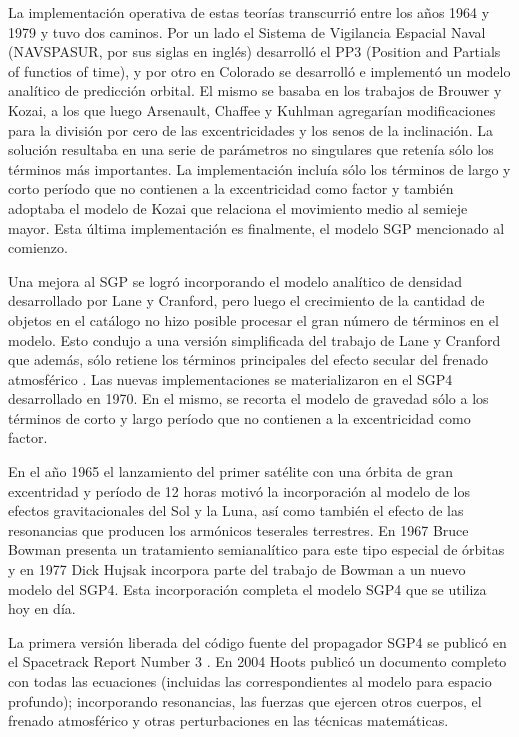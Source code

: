 {La implementaci\'on operativa de estas teor\'ias transcurri\'o entre los a\~nos 1964 y 1979 y tuvo dos caminos. Por un lado el Sistema de Vigilancia Espacial Naval (NAVSPASUR, por sus siglas en ingl\'es) desarroll\'o el PP3 (Position and Partials of functios of time), y por otro en Colorado se desarroll\'o e implement\'o un modelo anal\'itico de predicci\'on orbital. El mismo se basaba en los trabajos de Brouwer y Kozai, a los que luego Arsenault, Chaffee y Kuhlman \citep{arsenault1964general} agregar\'ian modificaciones para la divisi\'on por cero de las excentricidades y los senos de la inclinaci\'on. La soluci\'on resultaba en una serie de par\'ametros no singulares que reten\'ia s\'olo los t\'erminos m\'as importantes. La implementaci\'on inclu\'ia s\'olo los t\'erminos de largo y corto per\'iodo que no contienen a la excentricidad como factor y tambi\'en adoptaba el modelo de Kozai que relaciona el movimiento medio al semieje mayor. Esta \'ultima implementaci\'on es finalmente, el modelo SGP mencionado al comienzo.

Una mejora al SGP se logr\'o incorporando el modelo anal\'itico de densidad desarrollado por Lane y Cranford, pero luego el crecimiento de la cantidad de objetos en el cat\'alogo no hizo posible procesar el gran n\'umero de t\'erminos en el modelo. Esto condujo a una versi\'on simplificada del trabajo de Lane y Cranford que adem\'as, s\'olo retiene los t\'erminos principales del efecto secular del frenado atmosf\'erico \citep{lane1979general}. Las nuevas implementaciones se materializaron en el SGP4 desarrollado en 1970. En el mismo, se recorta el modelo de gravedad s\'olo a los t\'erminos de corto y largo per\'iodo que no contienen a la excentricidad como factor. 

En el a\~no 1965 el lanzamiento del primer sat\'elite con una \'orbita de gran excentridad y per\'iodo de 12 horas motiv\'o la incorporaci\'on al modelo de los efectos gravitacionales del Sol y la Luna, as\'i como tambi\'en el efecto de las resonancias que producen los arm\'onicos teserales terrestres. En 1967 Bruce Bowman \citep{bowman1971first} presenta un tratamiento semianal\'itico para este tipo especial de \'orbitas y en 1977 Dick Hujsak \citep{hujsak1979restricted} incorpora parte del trabajo de Bowman a un nuevo modelo del SGP4. Esta incorporaci\'on completa el modelo SGP4 que se utiliza hoy en d\'ia.

La primera versi\'on liberada del c\'odigo fuente del propagador SGP4 se public\'o en el Spacetrack Report Number 3 \citep{spacetrackreport3}. En 2004 Hoots public\'o un documento completo \citep{hoots2004history} con todas las ecuaciones (incluidas las correspondientes al modelo para espacio profundo); incorporando resonancias, las fuerzas que ejercen otros cuerpos, el frenado atmosf\'erico y otras perturbaciones en las t\'ecnicas matem\'aticas.

}
